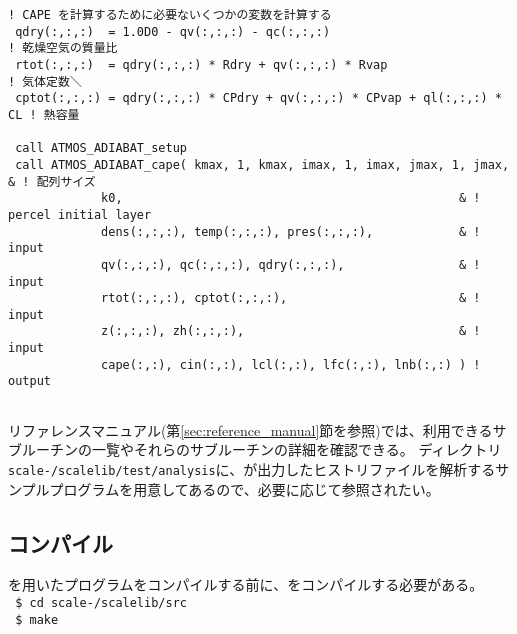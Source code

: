 {  \verb|! CAPE を計算するために必要ないくつかの変数を計算する|\\
  \verb| qdry(:,:,:)  = 1.0D0 - qv(:,:,:) - qc(:,:,:)                            ! 乾燥空気の質量比|\\
  \verb| rtot(:,:,:)  = qdry(:,:,:) * Rdry + qv(:,:,:) * Rvap                    ! 気体定数＼|\\
  \verb| cptot(:,:,:) = qdry(:,:,:) * CPdry + qv(:,:,:) * CPvap + ql(:,:,:) * CL ! 熱容量|\\
  \verb|                         |\\
  \verb| call ATMOS_ADIABAT_setup|\\
  \verb| call ATMOS_ADIABAT_cape( kmax, 1, kmax, imax, 1, imax, jmax, 1, jmax,      & ! 配列サイズ|\\
  \hspace{12em}\verb|             k0,                                               & ! percel initial layer|\\
  \hspace{12em}\verb|             dens(:,:,:), temp(:,:,:), pres(:,:,:),            & ! input|\\
  \hspace{12em}\verb|             qv(:,:,:), qc(:,:,:), qdry(:,:,:),                & ! input|\\
  \hspace{12em}\verb|             rtot(:,:,:), cptot(:,:,:),                        & ! input|\\
  \hspace{12em}\verb|             z(:,:,:), zh(:,:,:),                              & ! input|\\
  \hspace{12em}\verb|             cape(:,:), cin(:,:), lcl(:,:), lfc(:,:), lnb(:,:) ) ! output|\\
  \verb| |\\
}

リファレンスマニュアル(第\ref{sec:reference_manual}節を参照)では、利用できるサブルーチンの一覧やそれらのサブルーチンの詳細を確認できる。
ディレクトリ\texttt{scale-\version/scalelib/test/analysis}に、\scalerm が出力したヒストリファイルを解析するサンプルプログラムを用意してあるので、必要に応じて参照されたい。


\subsection{コンパイル}

\scalelib を用いたプログラムをコンパイルする前に、\scalelib をコンパイルする必要がある。\\
\texttt{ \$ cd scale-\version/scalelib/src}\\
\texttt{ \$ make}

